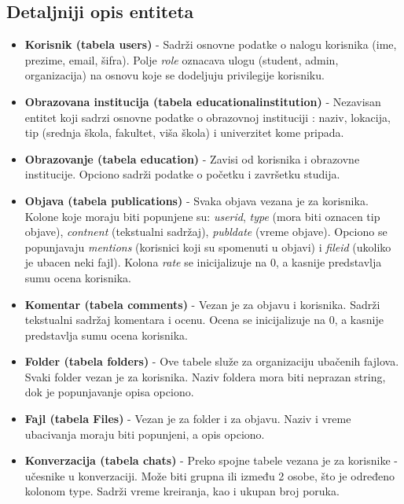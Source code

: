 \subsection{Detaljniji opis entiteta}
\begin{itemize}
    \item \textbf{Korisnik (tabela users)} -
    Sadrži osnovne podatke o nalogu korisnika (ime, prezime, email, šifra). Polje \textit{role} oznacava ulogu (student, admin, organizacija) na osnovu koje se dodeljuju privilegije korisniku.
    
    \item \textbf{Obrazovana institucija (tabela educational\textunderscore institution)} -
    Nezavisan entitet koji sadrzi osnovne podatke o obrazovnoj instituciji : naziv, lokacija, tip (srednja škola, fakultet, viša škola) i univerzitet kome pripada.
    
    \item \textbf{Obrazovanje (tabela education)} -
    Zavisi od korisnika i obrazovne institucije. Opciono sadrži podatke o početku i završetku studija.
    
    \item \textbf{Objava (tabela publications)} - 
    Svaka objava vezana je za korisnika. Kolone koje moraju biti popunjene su:\textit{ user\textunderscore id}, \textit{type} (mora biti oznacen tip objave), \textit{contnent} (tekstualni sadržaj),\textit{ publ\textunderscore date }(vreme objave). Opciono se popunjavaju \textit{mentions} (korisnici koji su spomenuti u objavi) i \textit{file\textunderscore id} (ukoliko je ubacen neki fajl). Kolona \textit{rate} se inicijalizuje na 0, a kasnije predstavlja sumu ocena korisnika.
    
    \item \textbf{Komentar (tabela comments)} -
    Vezan je za objavu i korisnika. Sadrži tekstualni sadržaj komentara i ocenu. Ocena se inicijalizuje na 0, a kasnije predstavlja sumu ocena korisnika.
    
    \item \textbf{Folder (tabela folders)} -
    Ove tabele služe za organizaciju ubačenih fajlova. Svaki folder vezan je za korisnika. Naziv foldera mora biti neprazan string, dok je popunjavanje opisa opciono.
    
    \item \textbf{Fajl (tabela Files)} -
    Vezan je za folder i za objavu. Naziv i vreme ubacivanja moraju biti popunjeni, a opis opciono.
    
    \item \textbf{Konverzacija (tabela chats)} -
    Preko spojne tabele vezana je za korisnike - učesnike u konverzaciji. Može biti grupna ili između 2 osobe, što je određeno kolonom type. Sadrži vreme kreiranja, kao i ukupan broj poruka.
    

\end{itemize}
